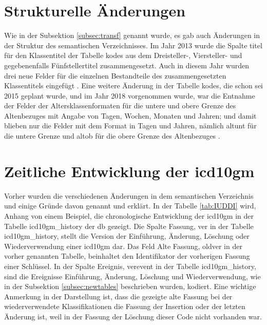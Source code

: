 \section{Strukturelle Änderungen} \label{sec:strucmodif}

Wie in der Subsektion \ref{subsec:transf} genannt wurde, es gab auch Änderungen in der Struktur des semantischen Verzeichnisses. Im Jahr 2013 wurde die Spalte \textsf{titel} für den Klassentitel der Tabelle \textsf{kodes} aus dem Dreisteller-, Viersteller- und gegebenenfalls Fünfstellertitel zusammengesetzt. Auch in diesem Jahr wurden drei neue Felder für die einzelnen Bestandteile des zusammengesetzten Klassentitels eingefügt \cite{readme13}. Eine weitere Änderung in der Tabelle \textsf{kodes}, die schon sei 2015 geplant wurde, und im Jahr 2018 vorgenommen wurde, war die Entnahme der Felder der Altersklassenformaten für die untere und obere Grenze des Altenbezuges mit Angabe von Tagen, Wochen, Monaten und Jahren; und damit blieben nur die Felder mit dem Format in Tagen und Jahren, nämlich  \textsf{altunt} für die untere Grenze und \textsf{altob} für die obere Grenze des Altenbezuges \cite{readme17}.

\section{Zeitliche Entwicklung der \acs{icd10gm}} \label{sec:timeicd}

Vorher wurden die verschiedenen Änderungen in dem semantischen Verzeichnis und einige Gründe davon genannt und erklärt. In der Tabelle \ref{tab:IUDDI} wird, Anhang von einem Beispiel, die chronologische Entwicklung der \ac{icd10gm} in der Tabelle \textsf{icd10gm\_history} der \ac{db} gezeigt. Die Spalte Fassung, \textsf{ver} in der Tabelle \textsf{icd10gm\_history}, stellt die Version der Einführung, Änderung, Löschung oder Wiederverwendung einer \ac{icd10gm} dar. Das Feld Alte Fassung, \textsf{oldver} in der vorher genannten Tabelle, beinhaltet den Identifikator der vorherigen Fassung einer Schlüssel. In der Spalte Ereignis, \textsf{verevent} in der Tabelle \textsf{icd10gm\_history}, sind die Ereignisse Einführung, Änderung, Löschung und Wiederverwendung, wie in der Subsektion \ref{subsec:newtables} beschrieben wurden, kodiert. Eine wichtige Anmerkung in der Darstellung ist, dass die gezeigte alte Fassung bei der wiederverwendete Klassifikationen die Fassung der Insertion oder der letzten Änderung ist, weil in der Fassung der Löschung dieser Code nicht vorhanden war.

